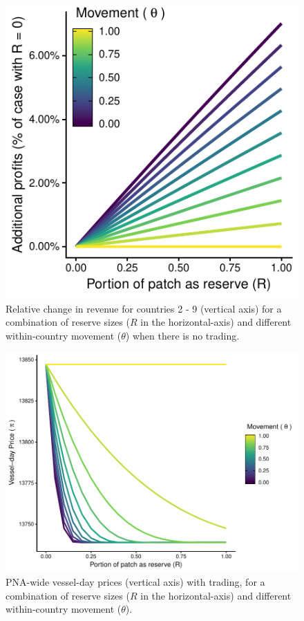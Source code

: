 \documentclass[12pt]{article}
\begin{document}
\begin{figure}[htbp]
\centering
\includegraphics{img/profits_PNA_notKIR_no_trading_plot.pdf}
\caption{\label{fig:profits_PNA_notKIR_no_trading_plot}Relative change in revenue for countries 2 - 9 (vertical axis) for a combination of reserve sizes ($R$ in the horizontal-axis) and different within-country movement ($\theta$) when there is no trading.}
\end{figure}

\begin{figure}
\centering
\includegraphics{img/vessel_day_price_with_trading_plot.pdf}
\caption{\label{fig:vessel_day_price_with_trading_plot}PNA-wide vessel-day prices (vertical axis) with trading, for a combination of reserve sizes ($R$ in the horizontal-axis) and different within-country movement ($\theta$).}
\end{figure}
\end{document}
